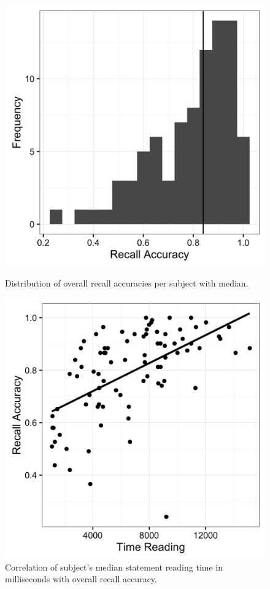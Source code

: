 \documentclass[a4paper,man,natbib,floatsintext,import]{apa6}
\begin{document}
\begin{figure}
\begin{minipage}[t]{.5\textwidth}
\includegraphics[width=.9\linewidth]{figures/genper_overall.png}
\caption{Distribution of overall recall accuracies per subject with median.}
\label{fig:genper_overall}
\end{minipage}
\begin{minipage}[t]{.5\textwidth}
\includegraphics[width=.9\linewidth]{figures/genper_timeXoverall.png}
\caption{Correlation of subject's median statement reading time in milliseconds with overall recall accuracy.}
\label{fig:genper_timeXoverall}
\end{minipage}
\end{figure}
\end{document}
